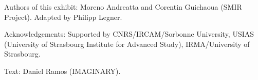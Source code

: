 \begin{sectcredits}
\item[Authors of this exhibit:] Moreno Andreatta and Corentin Guichaoua (SMIR Project). Adapted by Philipp Legner.
\item[Acknowledgements:] Supported by CNRS/IRCAM/Sorbonne University, USIAS (University of Strasbourg Institute for Advanced Study), IRMA/University of Strasbourg.
\item[Text:] Daniel Ramos (IMAGINARY).
\end{sectcredits}

